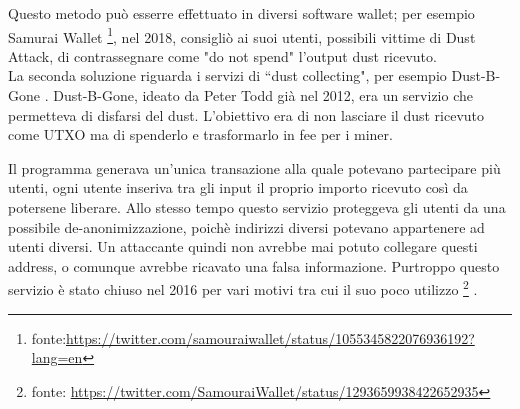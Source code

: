 Questo metodo può esserre effettuato in diversi software wallet; per esempio Samurai Wallet \footnote{fonte:\url{https://twitter.com/samouraiwallet/status/1055345822076936192?lang=en}}, nel 2018, consigliò ai suoi utenti, possibili vittime di Dust Attack,  di contrassegnare come "do not spend" l'output dust ricevuto.\\

La seconda soluzione riguarda i servizi di ``dust collecting", per esempio Dust-B-Gone \cite{Dbg}.
Dust-B-Gone, ideato da Peter Todd già nel 2012, era un servizio che permetteva di disfarsi del dust. L'obiettivo era di non lasciare il dust ricevuto come UTXO ma di spenderlo e trasformarlo in fee per i miner.

Il programma generava un'unica transazione alla quale potevano partecipare più utenti, ogni utente inseriva tra gli input il proprio importo ricevuto così da potersene liberare. Allo stesso tempo questo servizio proteggeva gli utenti da una possibile de-anonimizzazione, poichè indirizzi diversi potevano appartenere ad utenti diversi. Un attaccante quindi non avrebbe mai potuto collegare questi address, o comunque avrebbe ricavato una falsa informazione.
Purtroppo questo servizio è stato chiuso nel 2016 per vari motivi tra cui il suo poco utilizzo \footnote{fonte: \url{https://twitter.com/SamouraiWallet/status/1293659938422652935}} . 